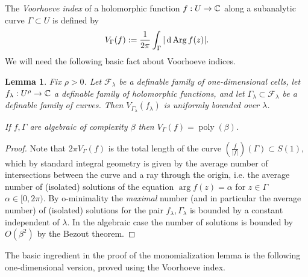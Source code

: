 \documentclass[reqno]{amsart}
\newtheorem{Lem}[Cor]{Lemma}{\bfseries}{\itshape}
\renewcommand\~[1]{\widetilde{#1}}
\def\Arg{\operatorname{Arg}} \def\dist{\operatorname{dist}}
\def\poly{\operatorname{poly}} \def\J{\operatorname{J}}
\def\cF{{\mathcal F}} \def\cL{{\mathcal L}} \def\cR{{\mathcal R}}
\begin{document}
The \emph{Voorhoeve index} \cite{ky:rolle} of a holomorphic function
$f:U\to{\mathbb C}$ along a subanalytic curve $\Gamma\subset U$ is defined by
\begin{equation}
  V_{\Gamma}(f):= \frac1{2\pi} \int_{\Gamma}|\d\Arg f(z)|.
\end{equation}
We will need the following basic fact about Voorhoeve indices.
\begin{Lem}\label{lem:voorhoeve-estimate}
  Fix $\rho>0$. Let $\cF_\lambda$ be a definable family of
  one-dimensional cells, let $f_\lambda:U^\rho\to{\mathbb C}$ a definable
  family of holomorphic functions, and let
  $\Gamma_\lambda\subset\cF_\lambda$ be a definable family of curves.
  Then $V_{\Gamma_\lambda}(f_\lambda)$ is uniformly bounded over
  $\lambda$.

  If $f,\Gamma$ are algebraic of complexity $\beta$ then
  $V_\Gamma(f)=\poly(\beta)$.
\end{Lem}
\begin{proof}
  Note that $2\pi V_\Gamma(f)$ is the total length of the curve
  $(\frac f{|f|})(\Gamma)\subset S(1)$, which by standard integral
  geometry is given by the average number of intersections between the
  curve and a ray through the origin, i.e. the average number of
  (isolated) solutions of the equation $\arg f(z)=\alpha$ for
  $z\in\Gamma$ $\alpha\in[0,2\pi)$. By o-minimality the \emph{maximal}
  number (and in particular the average number) of (isolated)
  solutions for the pair $f_\lambda,\Gamma_\lambda$ is bounded by a
  constant independent of $\lambda$. In the algebraic case the number
  of solutions is bounded by $O(\beta^2)$ by the Bezout theorem.
\end{proof}

The basic ingredient in the proof of the monomialization lemma is the
following one-dimensional version, proved using the Voorhoeve index.
\end{document}
